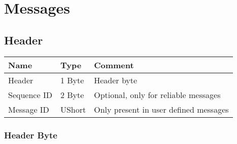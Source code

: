 \renewcommand{\namespace}{\nsLowLevel}

\setlength{\tableft}{0.15\textwidth}
\setlength{\tabright}{0.8\textwidth}



\chapter{Messages}

\section{Header}
{
\begin{tabular}{||p{3cm}|p{3cm}|p{8cm}||}
	\hline
	\rowcolor{yellow!50!} \textbf{Name} & \textbf{Type} & \textbf{Comment} \\
	\hline
	\hline
	Header & 1 Byte & Header byte \\
	\hline
	Sequence ID & 2 Byte & Optional, only for reliable messages \\
	\hline
	Message ID & UShort & Only present in user defined messages\\
	\hline
\end{tabular}
}

\subsection{Header Byte}

